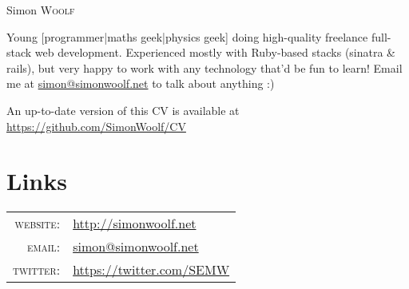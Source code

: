 \documentclass[a4paper,10pt]{article}
\begin{document}
\pagestyle{empty}

\par{\centering
  {\Huge Simon \textsc{Woolf}
}\bigskip\par}

Young [programmer|maths geek|physics geek] doing high-quality freelance
full-stack web development. Experienced mostly with Ruby-based stacks (sinatra
\& rails), but very happy to work with any technology that'd be fun to learn!
Email me at \href{mailto:simon@simonwoolf.net}{simon@simonwoolf.net} to talk 
about anything :)

An up-to-date version of this CV is available at \href{https://github.com/SimonWoolf/CV}{https://github.com/SimonWoolf/CV}

\section{Links}

\begin{tabular}{rl}
  \textsc{website:}   & \href{http://simonwoolf.net}{http://simonwoolf.net} \\
  \textsc{email:}     & \href{mailto:simon@simonwoolf.net}{simon@simonwoolf.net} \\
  \textsc{twitter:}   & \href{https://twitter.com/SEMW}{https://twitter.com/SEMW} \\
\end{tabular}
\end{document}

